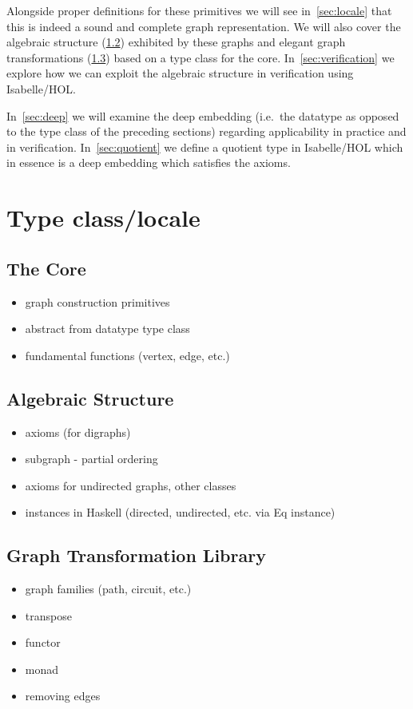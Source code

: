 \documentclass{article}
\begin{document}
Alongside proper definitions for these primitives we will see
in~\autoref{sec:locale} that this is indeed a sound and complete graph
representation. We will also cover the algebraic structure (\ref{sec:algebra})
exhibited by these graphs and elegant graph transformations (\ref{sec:trafo})
based on a type class for the core. In~\autoref{sec:verification} we explore how
we can exploit the algebraic structure in verification using Isabelle/HOL.

In~\autoref{sec:deep} we will examine the deep embedding (i.e.\
the datatype as opposed to the type class of the preceding sections) regarding
applicability in practice and in verification. In~\autoref{sec:quotient} we
define a quotient type in Isabelle/HOL which in essence is a deep embedding
which satisfies the axioms.

\section{Type class/locale}\label{sec:locale}
\subsection{The Core}\label{sec:core}
\begin{itemize}
\item graph construction primitives
\item abstract from datatype \textrightarrow{} type class
\item fundamental functions (vertex, edge, etc.)
\end{itemize}
\subsection{Algebraic Structure}\label{sec:algebra}
\begin{itemize}
\item axioms (for digraphs)
\item subgraph - partial ordering
\item axioms for undirected graphs, other classes
\item instances in Haskell (directed, undirected, etc. via Eq instance)
\end{itemize}
\subsection{Graph Transformation Library}\label{sec:trafo}
\begin{itemize}
\item graph families (path, circuit, etc.)
\item transpose
\item functor
\item monad
\item removing edges
\end{itemize}
\end{document}

